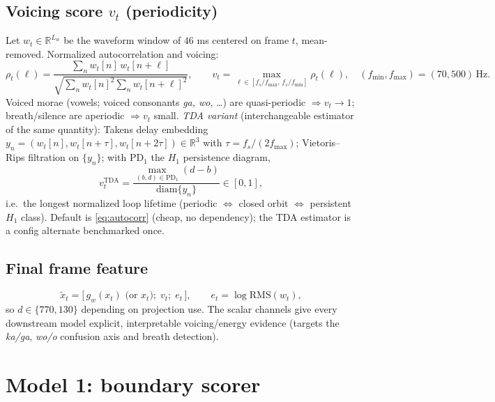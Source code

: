\documentclass[10pt]{article}
\newcommand{\R}{\mathbb{R}}
\begin{document}
\subsection{Voicing score $v_t$ (periodicity)}\label{sec:voicing}
Let $w_t \in \R^{L_w}$ be the waveform window of $46$ ms centered on frame $t$, mean-removed. Normalized autocorrelation and voicing:
\begin{equation}
\rho_t(\ell) = \frac{\sum_{n} w_t[n]\, w_t[n+\ell]}{\sqrt{\sum_n w_t[n]^2 \sum_n w_t[n+\ell]^2}},
\qquad
v_t = \max_{\ell \in [f_s/f_{\max},\, f_s/f_{\min}]} \rho_t(\ell),
\quad (f_{\min}, f_{\max}) = (70, 500)\,\mathrm{Hz}.
\label{eq:autocorr}
\end{equation}
Voiced morae (vowels; voiced consonants \emph{ga, wo}, \dots) are quasi-periodic $\Rightarrow v_t \to 1$; breath/silence are aperiodic $\Rightarrow v_t$ small. \emph{TDA variant} (interchangeable estimator of the same quantity): Takens delay embedding $y_n = (w_t[n], w_t[n+\tau], w_t[n+2\tau]) \in \R^3$ with $\tau = f_s/(2 f_{\max})$; Vietoris--Rips filtration on $\{y_n\}$; with $\mathrm{PD}_1$ the $H_1$ persistence diagram,
\begin{equation}
v_t^{\mathrm{TDA}} = \frac{\max_{(b,d) \in \mathrm{PD}_1} (d-b)}{\mathrm{diam}\{y_n\}} \in [0,1],
\end{equation}
i.e.\ the longest normalized loop lifetime (periodic $\Leftrightarrow$ closed orbit $\Leftrightarrow$ persistent $H_1$ class). Default is \eqref{eq:autocorr} (cheap, no dependency); the TDA estimator is a config alternate benchmarked once.

\subsection{Final frame feature}
\begin{equation}
\tilde{x}_t = \big[\, g_w(x_t) \text{ (or } x_t\text{)};\; v_t;\; e_t \,\big], \qquad e_t = \log \mathrm{RMS}(w_t),
\end{equation}
so $d \in \{770, 130\}$ depending on projection use. The scalar channels give every downstream model explicit, interpretable voicing/energy evidence (targets the \emph{ka/ga}, \emph{wo/o} confusion axis and breath detection).

\section{Model 1: boundary scorer}\label{sec:model1}
\end{document}
